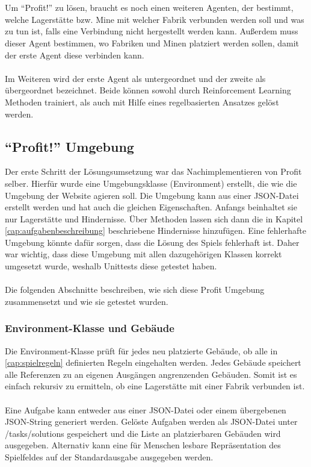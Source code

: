 \\\\
Um “Profit!” zu lösen, braucht es noch einen weiteren Agenten, der bestimmt, welche Lagerstätte bzw. Mine mit welcher Fabrik verbunden werden soll und was zu tun ist, falls eine Verbindung nicht hergestellt werden kann. Außerdem muss dieser Agent bestimmen, wo Fabriken und Minen platziert werden sollen, damit der erste Agent diese verbinden kann.
\\\\
Im Weiteren wird der erste Agent als untergeordnet und der zweite als übergeordnet bezeichnet. Beide können sowohl durch Reinforcement Learning Methoden trainiert, als auch mit Hilfe eines regelbasierten Ansatzes gelöst werden. 

\subsection{“Profit!” Umgebung}
Der erste Schritt der Lösungsumsetzung war das Nachimplementieren von Profit selber.  Hierfür wurde eine Umgebungsklasse (Environment) erstellt, die wie die Umgebung der Website agieren soll. Die Umgebung kann aus einer JSON-Datei erstellt werden und hat auch die gleichen Eigenschaften. Anfangs beinhaltet sie nur Lagerstätte und Hindernisse. Über Methoden lassen sich dann die in Kapitel \ref{cap:aufgabenbeschreibung} beschriebene Hindernisse hinzufügen.
Eine fehlerhafte Umgebung könnte dafür sorgen, dass die Lösung des Spiels fehlerhaft ist.
Daher war wichtig, dass diese Umgebung mit allen dazugehörigen Klassen korrekt umgesetzt wurde, weshalb Unittests diese getestet haben. 
\\\\
Die folgenden Abschnitte beschreiben, wie sich diese Profit Umgebung zusammensetzt und wie sie getestet wurden.

\subsubsection{Environment-Klasse und Gebäude}
Die Environment-Klasse prüft für jedes neu platzierte Gebäude, ob alle in \ref{cap:spielregeln} definierten Regeln eingehalten werden. Jedes Gebäude speichert alle Referenzen zu an eigenen Ausgängen angrenzenden Gebäuden. Somit ist es einfach rekursiv zu ermitteln, ob eine Lagerstätte mit einer Fabrik verbunden ist.
\\\\
Eine Aufgabe kann entweder aus einer JSON-Datei oder einem übergebenen JSON-String generiert werden. Gelöste Aufgaben werden als JSON-Datei unter /tasks/solutions gespeichert und die Liste an platzierbaren Gebäuden wird ausgegeben. Alternativ kann eine für Menschen lesbare Repräsentation des Spielfeldes auf der Standardausgabe ausgegeben werden.



